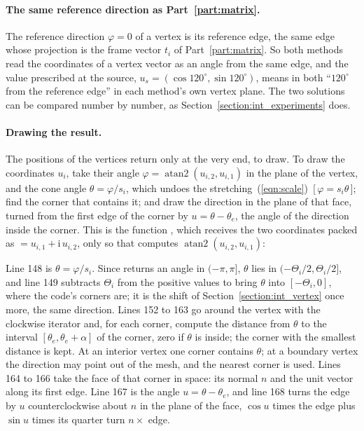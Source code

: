 \paragraph{The same reference direction as Part~\ref{part:matrix}.} The reference direction $\varphi = 0$ of a vertex is its reference edge, the same edge whose projection is the frame vector $t_i$ of Part~\ref{part:matrix}. So both methods read the coordinates of a vertex vector as an angle from the same edge, and the value prescribed at the source, $u_s = (\cos 120^\circ, \sin 120^\circ)$, means in both ``$120^\circ$ from the reference edge'' in each method's own vertex plane. The two solutions can be compared number by number, as Section~\ref{section:int_experiments} does.

\paragraph{Drawing the result.} The positions of the vertices return only at the very end, to draw. To draw the coordinates $u_i$, take their angle $\varphi = \operatorname{atan2}(u_{i,2}, u_{i,1})$ in the plane of the vertex, and the cone angle $\theta = \varphi / s_i$, which undoes the stretching~(\ref{eqn:scale})~[\,$\varphi = s_i\theta$\,]; find the corner that contains it; and draw the direction in the plane of that face, turned from the first edge of the corner by $u = \theta - \theta_e$, the angle of the direction inside the corner. This is the function , which receives the two coordinates packed as  $= u_{i,1} + \mathrm i\,u_{i,2}$, only so that  computes $\operatorname{atan2}(u_{i,2}, u_{i,1})$:

Line 148 is $\theta = \varphi/s_i$. Since  returns an angle in $(-\pi, \pi]$, $\theta$ lies in $(-\Theta_i/2, \Theta_i/2]$, and line 149 subtracts $\Theta_i$ from the positive values to bring $\theta$ into $[-\Theta_i, 0]$, where the code's corners are; it is the shift of Section~\ref{section:int_vertex} once more, the same direction. Lines 152 to 163 go around the vertex with the clockwise iterator and, for each corner, compute the distance from $\theta$ to the interval $[\theta_e, \theta_e + \alpha]$ of the corner, zero if $\theta$ is inside; the corner with the smallest distance is kept. At an interior vertex one corner contains $\theta$; at a boundary vertex the direction may point out of the mesh, and the nearest corner is used. Lines 164 to 166 take the face of that corner in space: its normal $n$ and the unit vector along its first edge. Line 167 is the angle $u = \theta - \theta_e$, and line 168 turns the edge by $u$ counterclockwise about $n$ in the plane of the face, $\cos u$ times the edge plus $\sin u$ times its quarter turn $n \times$ edge.

